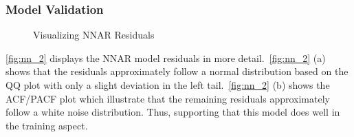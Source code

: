 \documentclass{article}\usepackage[]{graphicx}\usepackage[]{color}
\newenvironment{knitrout}{}{} %
\begin{document}
\subsubsection*{Model Validation}
\vspace{-20 pt}
\begin{knitrout}
\color{fgcolor}\begin{figure}[H]

{\centering {}

}

\caption[Visualizing NNAR Residuals]{Visualizing NNAR Residuals}\label{fig:nn_2}
\end{figure}


\end{knitrout}

\autoref{fig:nn_2} displays the NNAR model residuals in more detail.~\autoref{fig:nn_2} (a) shows that the residuals approximately follow a normal distribution based on the QQ plot with only a slight deviation in the left tail.~\autoref{fig:nn_2} (b) shows the ACF/PACF plot which illustrate that the remaining residuals approximately follow a white noise distribution. Thus, supporting that this model does well in the training aspect.
\end{document}
